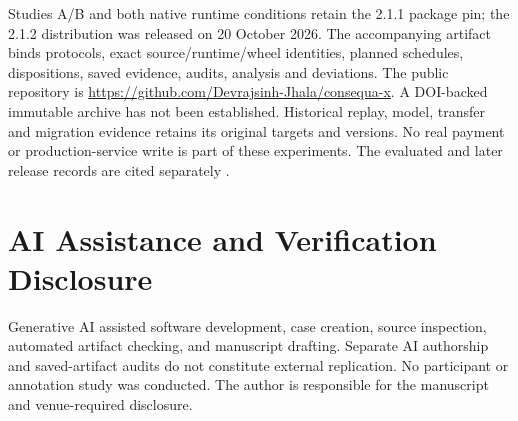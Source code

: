 \documentclass[conference]{IEEEtran}
\begin{document}
Studies A/B and both native runtime conditions retain the 2.1.1 package pin; the 2.1.2 distribution was released on 20 October 2026. The accompanying artifact binds protocols, exact source/runtime/wheel identities, planned schedules, dispositions, saved evidence, audits, analysis and deviations. The public repository is \url{https://github.com/Devrajsinh-Jhala/consequa-x}. A DOI-backed immutable archive has not been established. Historical replay, model, transfer and migration evidence retains its original targets and versions. No real payment or production-service write is part of these experiments. The evaluated and later release records are cited separately \cite{artifact,currentrelease}.

\section*{AI Assistance and Verification Disclosure}

Generative AI assisted software development, case creation, source inspection, automated artifact checking, and manuscript drafting. Separate AI authorship and saved-artifact audits do not constitute external replication. No participant or annotation study was conducted. The author is responsible for the manuscript and venue-required disclosure.
\end{document}
